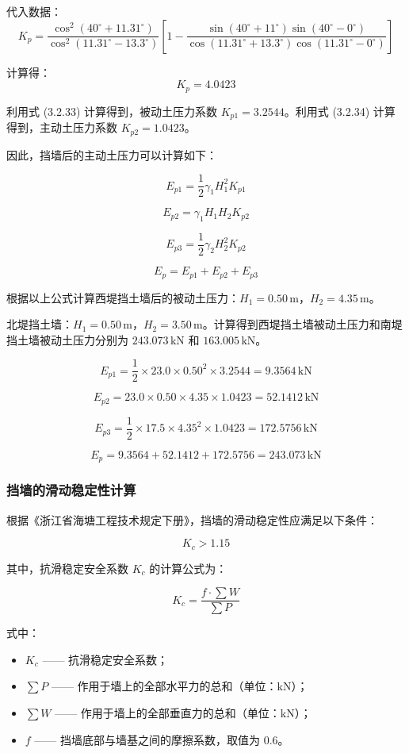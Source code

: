 \documentclass[UTF8, a4paper, 12pt]{ctexart} %
\begin{document}
代入数据：
\[
K_p = \frac{\cos^2 \left( 40^\circ + 11.31^\circ \right)}{\cos^2 \left( 11.31^\circ - 13.3^\circ \right)} 
\left[ 
1 - \frac{\sin \left( 40^\circ + 11^\circ \right) \sin \left( 40^\circ - 0^\circ \right)}{\cos \left( 11.31^\circ + 13.3^\circ \right) \cos \left( 11.31^\circ - 0^\circ \right)}
\right]
\]

计算得：
\[
K_p = 4.0423
\]

利用式 (3.2.33) 计算得到，被动土压力系数 $K_{p1} = 3.2544$。利用式 (3.2.34) 计算得到，主动土压力系数 $K_{p2} = 1.0423$。

因此，挡墙后的主动土压力可以计算如下：

\[
E_{p1} = \frac{1}{2} \gamma_1 H_1^2 K_{p1} \tag{3.30}
\]

\[
E_{p2} = \gamma_1 H_1 H_2 K_{p2} \tag{3.31}
\]

\[
E_{p3} = \frac{1}{2} \gamma_2 H_2^2 K_{p2} \tag{3.32}
\]

\[
E_p = E_{p1} + E_{p2} + E_{p3} \tag{3.33}
\]

根据以上公式计算西堤挡土墙后的被动土压力：$H_1 = 0.50\,\text{m}$，$H_2 = 4.35\,\text{m}$。

北堤挡土墙：$H_1 = 0.50\,\text{m}$，$H_2 = 3.50\,\text{m}$。计算得到西堤挡土墙被动土压力和南堤挡土墙被动土压力分别为 $243.073\,\text{kN}$ 和 $163.005\,\text{kN}$。

\[
E_{p1} = \frac{1}{2} \times 23.0 \times 0.50^2 \times 3.2544 = 9.3564\,\text{kN}
\]

\[
E_{p2} = 23.0 \times 0.50 \times 4.35 \times 1.0423 = 52.1412\,\text{kN}
\]

\[
E_{p3} = \frac{1}{2} \times 17.5 \times 4.35^2 \times 1.0423 = 172.5756\,\text{kN}
\]

\[
E_p = 9.3564 + 52.1412 + 172.5756 = 243.073\,\text{kN}
\]
\subsubsection{挡墙的滑动稳定性计算}

根据《浙江省海塘工程技术规定下册》，挡墙的滑动稳定性应满足以下条件：

\[
K_c > 1.15
\]

其中，抗滑稳定安全系数 $K_c$ 的计算公式为：

\[
K_c = \frac{f \cdot \sum W}{\sum P}
\]

式中：
\begin{itemize}
    \item $K_c$ —— 抗滑稳定安全系数；
    \item $\sum P$ —— 作用于墙上的全部水平力的总和（单位：$\text{kN}$）；
    \item $\sum W$ —— 作用于墙上的全部垂直力的总和（单位：$\text{kN}$）；
    \item $f$ —— 挡墙底部与墙基之间的摩擦系数，取值为 $0.6$。
\end{itemize}
\end{document}
